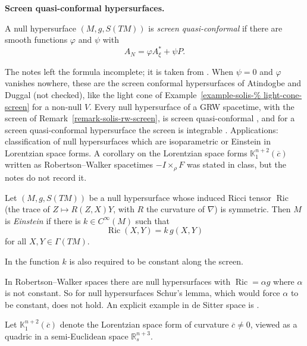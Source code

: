 \medskip\noindent
{\bf Screen quasi-conformal
hypersurfaces.}

\begin{definition}
\label{definition-solis-quasi-conformal}
A null hypersurface $(M,g,S(TM))$ is
\emph{screen quasi-conformal} if there are
smooth functions $\varphi$ and $\psi$
with
$$
A_N=\varphi A^*_{\xi}+\psi P.
$$
\end{definition}

\noindent
The notes left the formula incomplete;
it is taken from
\cite[Definition 3.1]{navarro2020screen}.
When $\psi=0$ and $\varphi$ vanishes
nowhere, these are the screen conformal
hypersurfaces of Atindogbe and Duggal
(not checked), like the light cone of
Example~\ref{example-solis-%
light-cone-screen} for a non-null $V$.
Every null hypersurface of a GRW
spacetime, with the screen of
Remark~\ref{remark-solis-rw-screen}, is
screen quasi-conformal
\cite[Example 3.3]{navarro2020screen}, and
for a screen quasi-conformal hypersurface
the screen is integrable
\cite[Theorem 3.6]{navarro2020screen}.
Applications: classification of null
hypersurfaces which are isoparametric or
Einstein in Lorentzian space forms. A
corollary on the Lorentzian space forms
$\mathbb{K}^{n+2}_1(\overline{c})$
written as Robertson--Walker spacetimes
$-I\times_{\rho}F$ was stated in class,
but the notes do not record it.

\begin{definition}
\label{definition-solis-einstein}
Let $(M,g,S(TM))$ be a null hypersurface
whose induced Ricci tensor
$\operatorname{Ric}$ (the trace of
$Z\mapsto R(Z,X)Y$, with $R$ the curvature
of $\nabla$) is symmetric. Then $M$ is
\emph{Einstein} if there is
$k\in C^{\infty}(M)$ such that
$$
\operatorname{Ric}(X,Y)=k\,g(X,Y)
$$
for all $X,Y\in\Gamma(TM)$.
\end{definition}

\noindent
In \cite[Definition 5.3]{navarro2020screen}
the function $k$ is also required to be
constant along the screen.

\begin{remark}
\label{remark-solis-schur}
In Robertson--Walker spaces there are
null hypersurfaces with
$\operatorname{Ric}=\alpha g$ where
$\alpha$ is not constant. So for null
hypersurfaces Schur's lemma, which would
force $\alpha$ to be constant, does not
hold. An explicit example in de Sitter
space is
\cite[Example 5.4]{navarro2020screen}.
\end{remark}

\noindent
Let $\mathbb{K}^{n+2}_1(\overline{c})$
denote the Lorentzian space form of
curvature $\overline{c}\neq 0$, viewed as
a quadric in a semi-Euclidean space
$\mathbb{R}^{n+3}_s$.


